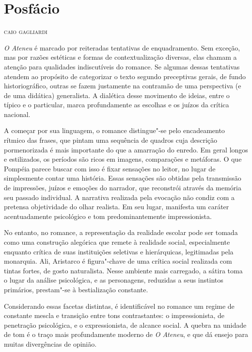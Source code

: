 \chapter[Posfácio]{Posfácio }


\begin{flushright}
\textsc{caio gagliardi}
\end{flushright}

\textit{O Ateneu} é marcado por reiteradas
tentativas de enquadramento. Sem exceção, mas por razões estéticas e
formas de contextualização diversas, elas chamam a atenção para
qualidades indiscutíveis do romance. Se algumas dessas tentativas
atendem ao propósito de categorizar o texto segundo preceptivas gerais,
de fundo historiográfico, outras se fazem justamente na contramão de
uma perspectiva (e de uma didática) generalista. A dialética desse
movimento de ideias, entre o típico e o particular, marca profundamente
as escolhas e os juízos da crítica nacional. 

A começar por sua linguagem, o romance distingue"-se pelo encadeamento
rítmico das frases, que pintam uma sequência de quadros cuja descrição
pormenorizada é mais importante do que a amarração do enredo. Em geral
longos e estilizados, os períodos são ricos em imagens, comparações e
metáforas. O que Pompéia parece buscar com isso é fixar sensações no
leitor, no lugar de simplesmente contar uma história. Essas sensações
são obtidas pela transmissão de impressões, juízos e emoções do
narrador, que reconstrói através da memória seu passado individual. A
narrativa realizada pela evocação não condiz com a pretensa
objetividade do olhar realista. Em seu lugar, manifesta um caráter
acentuadamente psicológico e tom predominantemente impressionista.

No entanto, no romance, a representação da realidade escolar pode ser
tomada como uma construção alegórica que remete à realidade social,
especialmente enquanto crítica de suas instituições seletivas e
hierárquicas, legitimadas pela monarquia. Ali, Aristarco é
figura"-chave de uma crítica social realizada com tintas fortes, de
gosto naturalista. Nesse ambiente mais carregado, a sátira toma o lugar
da análise psicológica, e as personagens, reduzidas a seus instintos
primários, prestam"-se à bestialização constante.

Considerando essas facetas distintas, é identificável no
romance um regime de constante mescla e transição entre tons
contrastantes: o impressionista, de penetração psicológica, e o
expressionista, de alcance social. A quebra na unidade de tom é o traço
mais profundamente moderno de \textit{O Ateneu}, 
e que dá ensejo para muitas divergências de opinião.  

